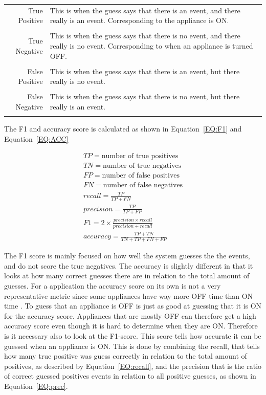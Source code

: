 \begin{tabularx}{\linewidth}{ r X }
True Positive& This is when the guess says that there is an event, and there really is an event. Corresponding to the appliance is ON. \\
\\
True Negative&This is when the guess says that there is no event, and there really is no event. Corresponding to when an appliance is turned OFF. \\
\\
False Positive& This is when the guess says that there is an event, but there really is no event. \\
\\
False Negative&This is when the guess says that there is no event, but there really is an event. \\\\
\end{tabularx}
The F1 and accuracy score is calculated as shown in Equation~\ref{EQ:F1} and Equation~\ref{EQ:ACC}

\begin{gather}
		TP = \text{number of true positives} \\
		TN = \text{number of true negatives} \\
		FP = \text{number of false positives} \\
		FN = \text{number of false negatives} \\
		recall = \frac{TP}{TP+FN} \label{EQ:recall}\\
		precision = \frac{TP}{TP+FP} \label{EQ:prec} \\
		F1 = 2 \times \frac{precision \times recall}{precision + recall} \label{EQ:F1}\\
		accuracy = \frac{TP+TN}{TN+TP+FN+FP} \label{EQ:ACC}
\end{gather}

The F1 score is mainly focused on how well the system guesses the the events, and do not score the true negatives. The accuracy is slightly different in that it looks at how many correct guesses there are in relation to the total amount of guesses. For a  application the accuracy score on its own is not a very representative metric since some appliances have way more OFF time than ON time \citep{RefWorks:35}. To guess that an appliance is OFF is just as good at guessing that it is ON for the accuracy score. Appliances that are mostly OFF can therefore get a high accuracy score even though it is hard to determine when they are ON. Therefore is it necessary also to look at the F1-score. This score tells how accurate it can be guessed when an appliance is ON. This is done by combining the recall, that tells how many true positive was guess correctly in relation to the total amount of positives, as described by Equation~\ref{EQ:recall}, and the precision that is the ratio of correct guessed positives events in relation to all positive guesses, as shown in Equation~\ref{EQ:prec}. 

